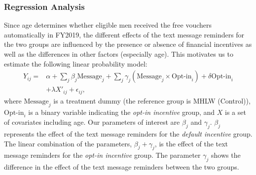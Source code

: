 \documentclass[
]{article}
\begin{document}
\hypertarget{regression-analysis}{%
\subsubsection{Regression Analysis}\label{regression-analysis}}

Since age determines whether eligible men received the free vouchers automatically in FY2019, the different effects of the text message reminders for the two groups are influenced by the presence or absence of financial incentives as well as the differences in other factors (especially age). This motivates us to estimate the following linear probability model:
\begin{equation}
\begin{split}
Y_{ij} = &\alpha + \sum_j \beta_j \text{Message}_j + \sum_j \gamma_j (\text{Message}_j \times \text{Opt-in}_i) + \delta \text{Opt-in}_i \\
&+ \lambda X'_{ij} + \epsilon_{ij},
\end{split} \label{eq:regression}
\end{equation}
where \(\text{Message}_j\) is a treatment dummy (the reference group is MHLW (Control)), \(\text{Opt-in}_i\) is a binary variable indicating the \emph{opt-in incentive} group, and \(X\) is a set of covariates including age. Our parameters of interest are \(\beta_j\) and \(\gamma_j\). \(\beta_j\) represents the effect of the text message reminders for the \emph{default incentive} group. The linear combination of the parameters, \(\beta_j + \gamma_j\), is the effect of the text message reminders for the \emph{opt-in incentive} group. The parameter \(\gamma_j\) shows the difference in the effect of the text message reminders between the two groups.
\end{document}
